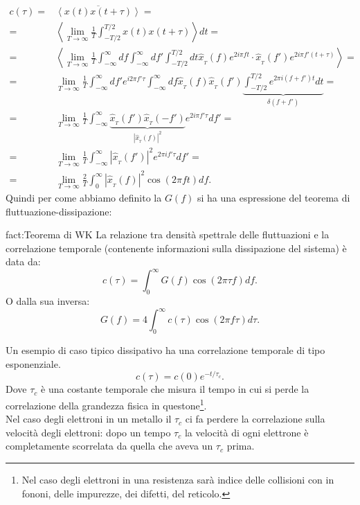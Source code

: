 \[\begin{aligned}
	c( \tau ) 
	=&
		\overline{\left<x( t) x( t+\tau ) \right>}= \\
	=&
		\left<
		\lim_{T \to \infty} \frac{1}{T}
		\int_{-T /2}^{T /2} x( t) x( t + \tau ) 
		\right>dt =\\
	=&
		\left<
		\lim_{T \to \infty} \frac{1}{T}
		\int_{-\infty}^{\infty}df
		\int_{-\infty}^{\infty}df'
		\int_{-T /2}^{T /2}dt
		\hat{x}_{_T} ( f) 
		e^{2i\pi f t}\cdot \hat{x}_{_T} ( f') 
		e^{2i\pi f' \left( t +\tau  \right) }
		\right>=\\
	=&
		\lim_{T \to \infty} \frac{1}{T} 
		\int_{-\infty}^{\infty} df'e^{i 2\pi f'\tau }
		\int_{-\infty}^{\infty}df\hat{x}_{_T}(f)\hat{x}_{_T}(f')
		\underbrace{
			\int_{-T/2}^{T/2}e^{2\pi i \left( f+f' \right)t}dt
		}_{\delta(f+f')}=\\
	=&
		\lim_{T \to \infty} \frac{1}{T}
		\int_{-\infty}^{\infty}
		\underbrace{
		\hat{x}_{_T}( f') \hat{x}_{_T}(-f')
		}_{\left| \hat{x}_{_T}(f) \right|^2}
		e^{2i\pi f' \tau }df'=\\
	=&
		\lim_{T \to \infty} \frac{1}{T}
		\int_{-\infty}^{\infty} 
		\left| \hat{x}_{_T}( f')  \right| ^2 
		e^{2\pi i f'\tau }df' =\\
	=&
		\lim_{T \to \infty} \frac{2}{T}
		\int_{0}^{\infty}
		\left| \hat{x}_{_T}(f) \right|^2 
		\cos(2\pi ft) df 
.\end{aligned}\]
Quindi per come abbiamo definito la $G(f)$ si ha una espressione del teorema di fluttuazione-dissipazione:
\begin{fact}{fact:Teorema di WK}
	La relazione tra densità spettrale delle fluttuazioni e la correlazione temporale (contenente informazioni sulla dissipazione del sistema) è data da:
	\[
	c(\tau)=\int_{0}^{\infty} G(f)\cos(2\pi\tau f)df  
	.\] 
	O dalla sua inversa:
	\[
	G( f) = 4\int_{0}^{\infty}c(\tau)\cos(2\pi f\tau)d\tau   
	.\]
\end{fact}
Un esempio di caso tipico dissipativo ha una correlazione temporale di tipo esponenziale.
\[
	c( \tau ) = c( 0) e^{- t/\tau _c}
.\] 
Dove $\tau_c$ è una costante temporale che misura il tempo in cui si perde la correlazione della grandezza fisica in questone\footnote{Nel caso degli elettroni in una resistenza sarà indice delle collisioni con in fononi, delle impurezze, dei difetti, del reticolo.}.\\
Nel caso degli elettroni in un metallo il $\tau_c$ ci fa perdere la correlazione sulla velocità degli elettroni: dopo un tempo $\tau_c$ la velocità di ogni elettrone è completamente scorrelata da quella che aveva un $\tau_c$ prima.\\
